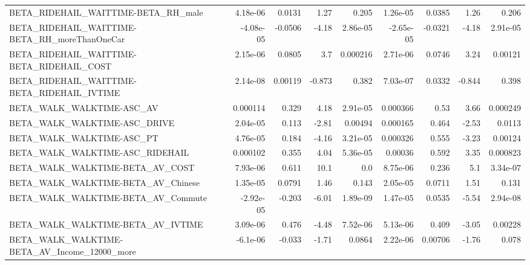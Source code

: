 \begin{tabular}{lrrrrrrrr}
BETA\_RIDEHAIL\_WAITTIME-BETA\_RH\_male                &    4.18e-06 &       0.0131 &     1.27 &    0.205 &   1.26e-05 &      0.0385 &         1.26 &         0.206 \\
BETA\_RIDEHAIL\_WAITTIME-BETA\_RH\_moreThanOneCar      &   -4.08e-05 &      -0.0506 &    -4.18 & 2.86e-05 &  -2.65e-05 &     -0.0321 &        -4.18 &      2.91e-05 \\
BETA\_RIDEHAIL\_WAITTIME-BETA\_RIDEHAIL\_COST          &    2.15e-06 &       0.0805 &      3.7 & 0.000216 &   2.71e-06 &      0.0746 &         3.24 &       0.00121 \\
BETA\_RIDEHAIL\_WAITTIME-BETA\_RIDEHAIL\_IVTIME        &    2.14e-08 &      0.00119 &   -0.873 &    0.382 &   7.03e-07 &      0.0332 &       -0.844 &         0.398 \\
BETA\_WALK\_WALKTIME-ASC\_AV                          &    0.000114 &        0.329 &     4.18 & 2.91e-05 &   0.000366 &        0.53 &         3.66 &      0.000249 \\
BETA\_WALK\_WALKTIME-ASC\_DRIVE                       &    2.04e-05 &        0.113 &    -2.81 &  0.00494 &   0.000165 &       0.464 &        -2.53 &        0.0113 \\
BETA\_WALK\_WALKTIME-ASC\_PT                          &    4.76e-05 &        0.184 &    -4.16 & 3.21e-05 &   0.000326 &       0.555 &        -3.23 &       0.00124 \\
BETA\_WALK\_WALKTIME-ASC\_RIDEHAIL                    &    0.000102 &        0.355 &     4.04 & 5.36e-05 &    0.00036 &       0.592 &         3.35 &      0.000823 \\
BETA\_WALK\_WALKTIME-BETA\_AV\_COST                    &    7.93e-06 &        0.611 &     10.1 &      0.0 &   8.75e-06 &       0.236 &          5.1 &      3.34e-07 \\
BETA\_WALK\_WALKTIME-BETA\_AV\_Chinese                 &    1.35e-05 &       0.0791 &     1.46 &    0.143 &   2.05e-05 &      0.0711 &         1.51 &         0.131 \\
BETA\_WALK\_WALKTIME-BETA\_AV\_Commute                 &   -2.92e-05 &       -0.203 &    -6.01 & 1.89e-09 &   1.47e-05 &      0.0535 &        -5.54 &      2.94e-08 \\
BETA\_WALK\_WALKTIME-BETA\_AV\_IVTIME                  &    3.09e-06 &        0.476 &    -4.48 & 7.52e-06 &   5.13e-06 &       0.409 &        -3.05 &       0.00228 \\
BETA\_WALK\_WALKTIME-BETA\_AV\_Income\_12000\_more       &    -6.1e-06 &       -0.033 &    -1.71 &   0.0864 &   2.22e-06 &     0.00706 &        -1.76 &         0.078 \\

\end{tabular}
